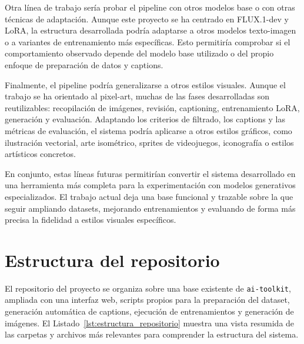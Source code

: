 \documentclass[a4paper,11pt,titlepage]{scrbook}
\begin{document}
\medskip

Otra línea de trabajo sería probar el pipeline con otros modelos base o con otras técnicas de adaptación. Aunque este proyecto se ha centrado en FLUX.1-dev y LoRA, la estructura desarrollada podría adaptarse a otros modelos texto-imagen o a variantes de entrenamiento más específicas. Esto permitiría comprobar si el comportamiento observado depende del modelo base utilizado o del propio enfoque de preparación de datos y captions.

\medskip

Finalmente, el pipeline podría generalizarse a otros estilos visuales. Aunque el trabajo se ha orientado al pixel-art, muchas de las fases desarrolladas son reutilizables: recopilación de imágenes, revisión, captioning, entrenamiento LoRA, generación y evaluación. Adaptando los criterios de filtrado, los captions y las métricas de evaluación, el sistema podría aplicarse a otros estilos gráficos, como ilustración vectorial, arte isométrico, sprites de videojuegos, iconografía o estilos artísticos concretos.

\medskip

En conjunto, estas líneas futuras permitirían convertir el sistema desarrollado en una herramienta más completa para la experimentación con modelos generativos especializados. El trabajo actual deja una base funcional y trazable sobre la que seguir ampliando datasets, mejorando entrenamientos y evaluando de forma más precisa la fidelidad a estilos visuales específicos.





%


\appendix
\chapter{Estructura del repositorio}
\label{anexo:estructura_repositorio}

El repositorio del proyecto se organiza sobre una base existente de \texttt{ai-toolkit}, ampliada con una interfaz web, scripts propios para la preparación del dataset, generación automática de captions, ejecución de entrenamientos y generación de imágenes. El Listado~\ref{lst:estructura_repositorio} muestra una vista resumida de las carpetas y archivos más relevantes para comprender la estructura del sistema.
\end{document}
